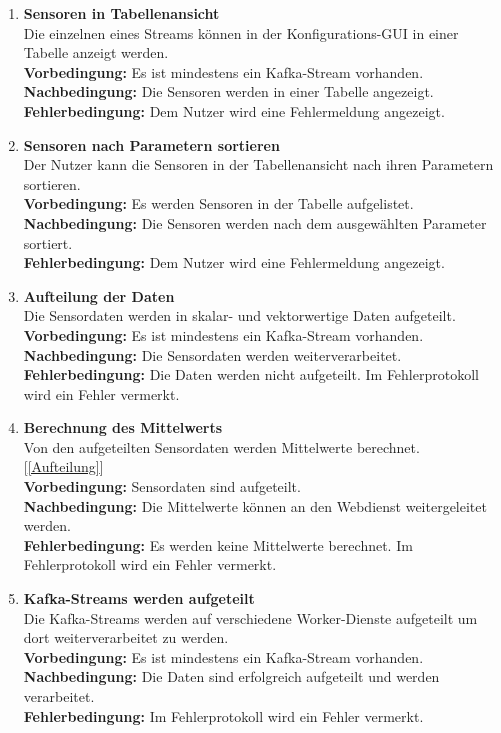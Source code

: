 \begin{enumerate}[label=\textbf{PF\arabic{enumi}0}]
	\item \textbf{Sensoren in Tabellenansicht}\\
		Die einzelnen  eines Streams können in der Konfigurations-GUI in einer Tabelle anzeigt werden.\\
		\textbf{Vorbedingung:} Es ist mindestens ein Kafka-Stream vorhanden.\\
		\textbf{Nachbedingung:} Die Sensoren werden in einer Tabelle angezeigt.\\
		\textbf{Fehlerbedingung:} Dem Nutzer wird eine Fehlermeldung angezeigt.
		
	\item \textbf{Sensoren nach Parametern sortieren}\\
		Der Nutzer kann die Sensoren in der Tabellenansicht nach ihren Parametern sortieren.\\
		\textbf{Vorbedingung:} Es werden Sensoren in der Tabelle aufgelistet.\\
		\textbf{Nachbedingung:} Die Sensoren werden nach dem ausgewählten Parameter sortiert.\\
		\textbf{Fehlerbedingung:} Dem Nutzer wird eine Fehlermeldung angezeigt.
		
	\item \textbf{Aufteilung der Daten} \label{Aufteilung}\\
		Die Sensordaten werden in skalar- und vektorwertige Daten aufgeteilt.\\
		\textbf{Vorbedingung:} Es ist mindestens ein Kafka-Stream vorhanden.\\
		\textbf{Nachbedingung:} Die Sensordaten werden weiterverarbeitet.\\
		\textbf{Fehlerbedingung:} Die Daten werden nicht aufgeteilt. Im Fehlerprotokoll wird ein Fehler vermerkt.
		
	\item \textbf{Berechnung des Mittelwerts} \label{Mittel}\\
		Von den aufgeteilten Sensordaten werden Mittelwerte berechnet. [\ref{Aufteilung}]\\
		\textbf{Vorbedingung:} Sensordaten sind aufgeteilt.\\
		\textbf{Nachbedingung:} Die Mittelwerte können an den Webdienst weitergeleitet werden.\\
		\textbf{Fehlerbedingung:} Es werden keine Mittelwerte berechnet. Im Fehlerprotokoll wird ein Fehler vermerkt.
		
	\item \textbf{Kafka-Streams werden aufgeteilt}\\
		Die Kafka-Streams werden auf verschiedene Worker-Dienste aufgeteilt um dort weiterverarbeitet zu werden.\\
		\textbf{Vorbedingung:} Es ist mindestens ein Kafka-Stream vorhanden.\\
		\textbf{Nachbedingung:} Die Daten sind erfolgreich aufgeteilt und werden verarbeitet.\\
		\textbf{Fehlerbedingung:} Im Fehlerprotokoll wird ein Fehler vermerkt.
		

\end{enumerate}
